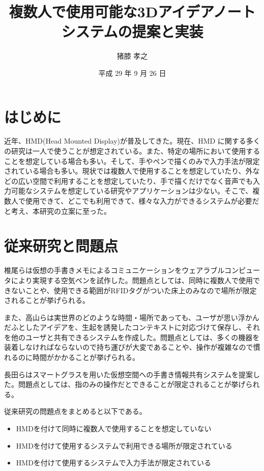 \documentclass[twocolumn, a4paper]{UECIEresume}
\title{複数人で使用可能な3Dアイデアノートシステムの提案と実装}
\date{平成 29 年 9 月 26 日}
\affiliation{情報学専攻 メディア情報学プログラム}
\author{猪膝 孝之}
\begin{document}
\maketitle

\section{はじめに}
近年、HMD(Head Mounted Display)が普及してきた。現在、HMD に関する多くの研究は一人で使うことが想定されている。また、特定の場所において使用することを想定している場合も多い。そして、手やペンで描くのみで入力手法が限定されている場合も多い。現状では複数人で使用することを想定していたり、外などの広い空間で利用することを想定していたり、手で描くだけでなく音声でも入力可能なシステムを想定している研究やアプリケーションは少ない。そこで、複数人で使用できて、どこでも利用できて、様々な入力ができるシステムが必要だと考え、本研究の立案に至った。

\section{従来研究と問題点}
椎尾ら\cite{tex1,tex2}は仮想の手書きメモによるコミュニケーションをウェアラブルコンピュータにより実現する空気ペンを試作した。問題点としては、同時に複数人で使用できないことや、使用できる範囲がRFIDタグがついた床上のみなので場所が限定されることが挙げられる。

また、高山ら\cite{tex3,tex4}は実世界のどのような時間・場所であっても、ユーザが思い浮かんだふとしたアイデアを、生起を誘発したコンテキストに対応づけて保存し、それを他のユーザと共有できるシステムを作成した。問題点としては、多くの機器を装着しなければならないので持ち運びが大変であることや、操作が複雑なので慣れるのに時間がかかることが挙げられる。

長田ら\cite{tex5}はスマートグラスを用いた仮想空間への手書き情報共有システムを提案した。問題点としては、指のみの操作だとできることが限定されることが挙げられる。

従来研究の問題点をまとめると以下である。

\begin{itemize}
 \item HMDを付けて同時に複数人で使用することを想定していない
 \item HMDを付けて使用するシステムで利用できる場所が限定されている
 \item HMDを付けて使用するシステムで入力手法が限定されている
\end{itemize}
\end{document}
